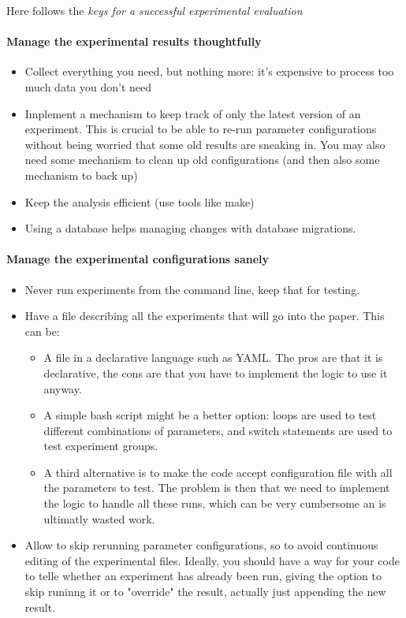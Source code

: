 \documentclass{llncs}
\begin{document}
Here follows the \emph{keys for a successful experimental evaluation}

\paragraph{Manage the experimental results thoughtfully}

\begin{itemize}
\item Collect everything you need, but nothing more: it's expensive to process too
  much data you don't need
\item Implement a mechanism to keep track of only the latest version of an
  experiment. This is crucial to be able to re-run parameter configurations
  without being worried that some old results are sneaking in. You may also
  need some mechanism to clean up old configurations (and then also some
  mechanism to back up)
\item Keep the analysis efficient (use tools like make)
\item Using a database helps managing changes with database migrations.
\end{itemize}

\paragraph{Manage the experimental configurations sanely}

\begin{itemize}
\item Never run experiments from the command line, keep that for testing.
\item Have a file describing all the experiments that will go into the paper. This
  can be:
  \begin{itemize}
  \item A file in a declarative language such as YAML. The pros are that it is
    declarative, the cons are that you have to implement the logic to use it
    anyway.
  \item A simple bash script might be a better option: loops are used to test
      different combinations of parameters, and switch statements are used to
      test experiment groups.
  \item A third alternative is to make the code accept configuration file with all
      the parameters to test. The problem is then that we need to implement the
      logic to handle all these runs, which can be very cumbersome an is
      ultimatly wasted work.
  \end{itemize}
\item Allow to skip rerunning parameter configurations, so to avoid continuous
  editing of the experimental files. Ideally, you should have a way for your
  code to telle whether an experiment has already been run, giving the option
  to skip runinng it or to "override" the result, actually just appending the
  new result.
\end{itemize}
\end{document}
